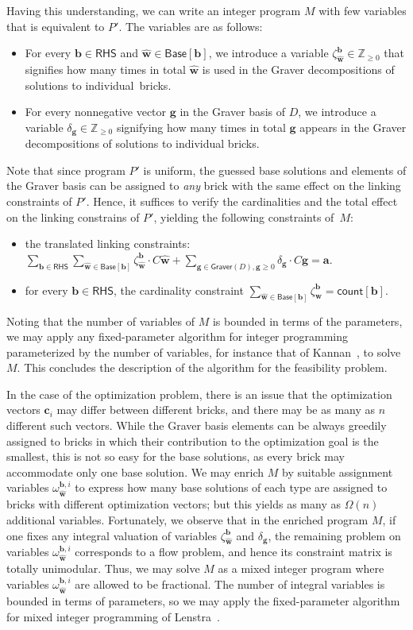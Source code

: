 \documentclass{theoretics}
\renewcommand{\geq}{\geqslant}
\newcommand{\Z}{\mathbb{Z}}
\newcommand{\Zn}{\Z_{\geq 0}}
\newcommand{\tup}[1]{{\mathbf{#1}}}
\newcommand{\ww}{\tup w}
\newcommand{\whww}{{\widehat{\ww}}}
\newcommand{\av}{\tup a}
\newcommand{\bb}{\tup b}
\renewcommand{\gg}{\tup g}
\newcommand{\cc}{\tup c}
\newcommand{\Graver}{\mathsf{Graver}}
\newcommand{\RHS}{\mathsf{RHS}}
\newcommand{\Base}{\mathsf{Base}}
\newcommand{\cntTypes}{\mathsf{count}}
\begin{document}
Having this understanding, we can write an integer program $M$ with few variables that is equivalent to $P'$. The variables are as follows:
\begin{itemize}[nosep]
    \item For every $\bb\in \RHS$ and $\whww\in \Base[\bb]$, we introduce a variable $\zeta^\bb_\whww\in \Zn$ that signifies how many times in total $\whww$ is used in the Graver decompositions of solutions to individual~bricks.
    \item For every nonnegative vector $\gg$ in the Graver basis of $D$, we introduce a variable $\delta_\gg\in \Zn$ signifying how many times in total $\gg$ appears in the Graver decompositions of solutions to individual bricks.
\end{itemize}
Note that since program $P'$ is uniform, the guessed base solutions and elements of the Graver basis can be assigned to {\em{any}} brick with the same effect on the linking constraints of $P'$. Hence, it suffices to verify the cardinalities and the total effect on the linking constrains of $P'$, yielding the following constraints of~$M$:
\begin{itemize}[nosep]
    \item the translated linking constraints: $\sum_{\bb\in \RHS}\sum_{\whww\in \Base[\bb]} \zeta^{\bb}_\whww\cdot C\whww+\sum_{\gg\in \Graver(D), \gg\geq 0} \delta_\gg\cdot C\gg =\av$.
    \item for every $\bb\in \RHS$, the cardinality constraint $\sum_{\whww\in \Base[\bb]}\zeta^\bb_\whww=\cntTypes[\bb]$.
\end{itemize}
Noting that the number of variables of $M$ is bounded in terms of the parameters, we may apply any fixed-parameter algorithm for integer programming parameterized by the number of variables, for instance that of Kannan~\cite{kannan1987minkowski}, to solve $M$. This concludes the description of the algorithm for the feasibility problem.

In the case of the optimization problem, there is an issue that the optimization vectors $\cc_i$ may differ between different bricks, and there may be as many as $n$ different such vectors. While the Graver basis elements can be always greedily assigned to bricks in which their contribution to the optimization goal is the smallest, this is not so easy for the base solutions, as every brick may accommodate only one base solution.
We may enrich $M$ by suitable assignment variables $\omega^{\bb,i}_{\whww}$ to express how many base solutions of each type are assigned to bricks with different optimization vectors; but this yields as many as $\Omega(n)$ additional variables. Fortunately, we observe that in the enriched program $M$, if one fixes any integral valuation of variables $\zeta^{\bb}_{\whww}$ and $\delta_\gg$, the remaining problem on variables $\omega^{\bb,i}_{\whww}$ corresponds to a flow problem, and hence its constraint matrix is totally unimodular. Thus, we may solve $M$ as a mixed integer program where variables $\omega^{\bb,i}_{\whww}$ are allowed to be fractional. The number of integral variables is bounded in terms of parameters, so we may apply the fixed-parameter algorithm for mixed integer programming of Lenstra~\cite{Lenstra1983}.
\end{document}

